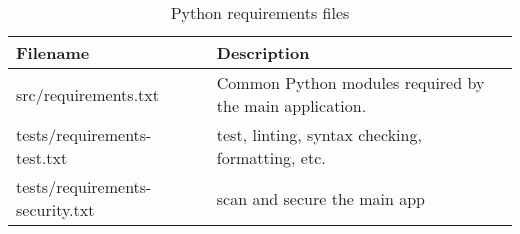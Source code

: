 \begin{table}[ht]
    \centering
    \begin{tabular}{|l|l|}\hline
        Filename & Description \\\hline
        src/requirements.txt & Common Python modules required by the main application.    \\\hline
        tests/requirements-test.txt & test, linting, syntax checking, formatting, etc.    \\\hline
        tests/requirements-security.txt  &  scan and secure the main app   \\\hline
    \end{tabular}
    \caption{Python requirements files}
    \label{Requirements}
\end{table}

\clearpage
\begin{versionhistory}
\end{versionhistory}
\nocite{*}




